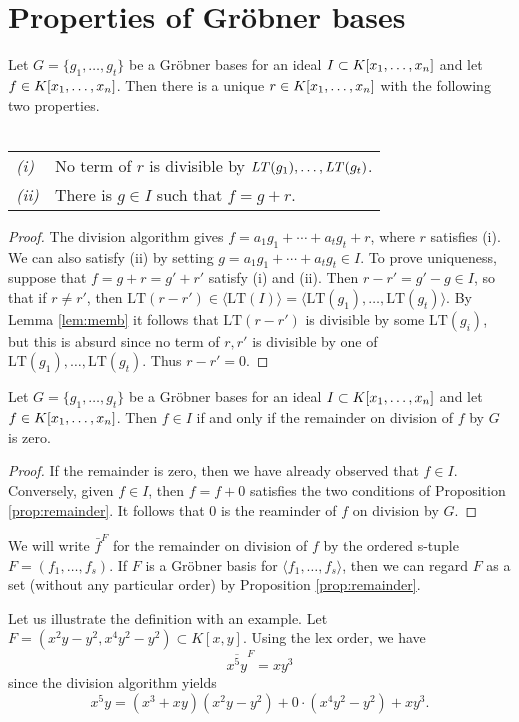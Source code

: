 \documentclass[english,bachelor]{liumaiex}
\begin{document}
\section{Properties of Gröbner bases}
\begin{prop}\label{prop:remainder}
Let $G=\{g_1,\dots,g_t\}$ be a Gröbner bases for an ideal $I\subset K[x_1,\dots, x_n]$ and let $f\in K[x_1,\dots, x_n]$. Then there is a unique $r\in K[x_1,\dots, x_n]$ with the following two properties.\\ \\
\begin{tabular}{ll}
\emph{(i)}& No term of $r$ is divisible by $\textrm{\emph{LT}}(g_1),\dots,\textrm{\emph{LT}}(g_t)$.\\
\emph{(ii)}&There is $g\in I$ such that $f=g+r$.
\end{tabular}
\end{prop}

\begin{proof}
The division algorithm gives $f=a_1g_1+\cdots+a_tg_t+r$, where $r$ satisfies (i). We can also satisfy (ii) by setting $g=a_1g_1+\cdots+a_tg_t\in I$. To prove uniqueness, suppose that $f=g+r=g'+r'$ satisfy (i) and (ii). Then $r-r'=g'-g\in I$, so that if $r\neq r'$, then $\textrm{LT}(r-r')\in\langle\textrm{LT}(I)\rangle=\langle\textrm{LT}(g_1),\dots,\textrm{LT}(g_t)\rangle$. By Lemma \ref{lem:memb} it follows that $\textrm{LT}(r-r')$ is divisible by some $\textrm{LT}(g_i)$, but this is absurd since no term of $r,r'$ is divisible by one of $\textrm{LT}(g_1),\dots,\textrm{LT}(g_t)$. Thus $r-r'=0$.
\end{proof}

\begin{thm}
Let $G=\{g_1,\dots,g_t\}$ be a Gröbner bases for an ideal $I\subset K[x_1,\dots, x_n]$ and let $f\in K[x_1,\dots, x_n]$. Then $f\in I$ if and only if the remainder on division of $f$ by $G$ is zero.
\end{thm}

\begin{proof}
If the remainder is zero, then we have already observed that $f\in I$. Conversely, given $f\in I$, then $f=f+0$ satisfies the two conditions of Proposition \ref{prop:remainder}. It follows that $0$ is the reaminder of $f$ on division by $G$.
\end{proof}

\begin{define}
We will write $\bar{f}^F$ for the remainder on division of $f$ by the ordered s-tuple $F=(f_1,\dots,f_s)$. If $F$ is a Gröbner basis for $\langle f_1,\dots,f_s\rangle$, then we can regard $F$ as a set (without any particular order) by Proposition \ref{prop:remainder}.
\end{define}
Let us illustrate the definition with an example. Let $F=(x^2y-y^2,x^4y^2-y^2)\subset K[x,y]$. Using the lex order, we have
\begin{displaymath}
\overline{x^5y}^F=xy^3
\end{displaymath}
since the division algorithm yields
\begin{displaymath}
x^5y=(x^3+xy)(x^2y-y^2)+0\cdot(x^4y^2-y^2)+xy^3.
\end{displaymath}
\end{document}
